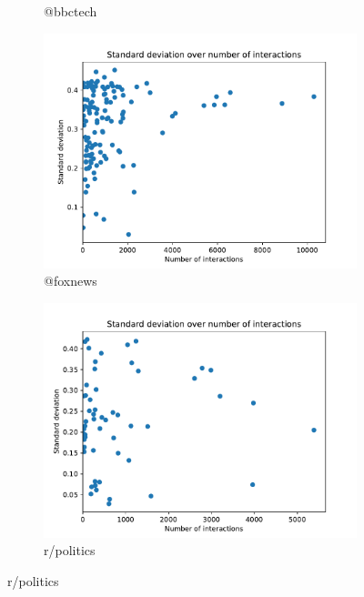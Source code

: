 \documentclass{beamer}
\begin{document}
\begin{frame}[c]
\begin{figure}
\begin{center}
\begin{subfigure}[b]{0.4\textwidth}
                \caption{@bbctech}
                \label{fig:out/bbctech200/std-dev-n-interactions.pdf}
            \end{subfigure}
            \begin{subfigure}[b]{0.4\textwidth}
                \centering
                \includegraphics[width=\textwidth]{out/foxnews400/std-dev-n-interactions.pdf}
                \caption{@foxnews}
                \label{fig:out/foxnews400/std-dev-n-interactions.pdf}
            \end{subfigure}
            \begin{subfigure}[b]{0.4\textwidth}
                \centering
                \includegraphics[width=\textwidth]{out/politics200/std-dev-n-interactions.pdf}
                \caption{r/politics}
                \label{fig:out/politics200/std-dev-n-interactions.pdf}
            \end{subfigure}
        \end{center}
    \end{figure}
\end{frame}
\end{document}
